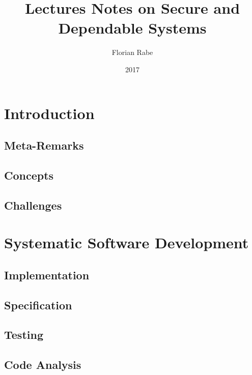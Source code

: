 \documentclass{book}
\title{Lectures Notes on Secure and Dependable Systems}
\author{Florian Rabe}
\date{2017}
\begin{document}
\maketitle

\tableofcontents
\newpage

\part{Introduction}

 \chapter{Meta-Remarks}
  

  \chapter{Concepts}
   

 \chapter{Challenges}
   

\part{Systematic Software Development}

  \chapter{Implementation}
    
     
  \chapter{Specification}
    

  \chapter{Testing}
    

  \chapter{Code Analysis}
    
    
\end{document}
